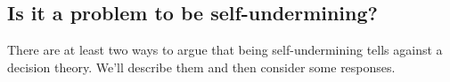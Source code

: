 \documentclass[a4paper]{article}
\newcommand{\todoinfo}[2][]{\todo[backgroundcolor=orange!80,bordercolor=black,linecolor=gray!80, #1,inline,caption={}]{#2}}
\renewcommand{\color}[1]{}
\newenvironment{CCM rewritten}
{\begingroup\color{blue}} %
{\endgroup}              %
\begin{document}
\subsection{Is it a problem to be self-undermining?}\label{sect:reu:phil-discussion}

There are at least two ways to argue that being self-undermining tells against a decision theory. We'll describe them and then consider some responses.

%

\end{document}

